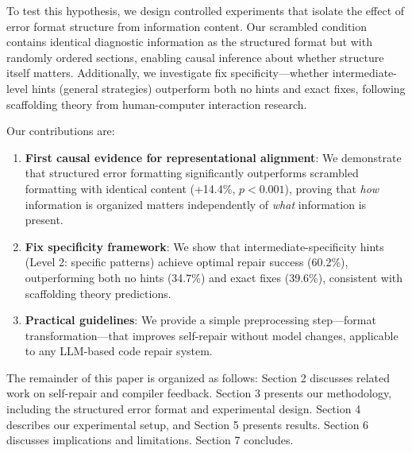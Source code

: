 To test this hypothesis, we design controlled experiments that isolate the effect of error format structure from information content. Our scrambled condition contains identical diagnostic information as the structured format but with randomly ordered sections, enabling causal inference about whether structure itself matters. Additionally, we investigate fix specificity---whether intermediate-level hints (general strategies) outperform both no hints and exact fixes, following scaffolding theory from human-computer interaction research.

Our contributions are:

\begin{enumerate}
    \item \textbf{First causal evidence for representational alignment}: We demonstrate that structured error formatting significantly outperforms scrambled formatting with identical content (+14.4\%, $p < 0.001$), proving that \emph{how} information is organized matters independently of \emph{what} information is present.

    \item \textbf{Fix specificity framework}: We show that intermediate-specificity hints (Level 2: specific patterns) achieve optimal repair success (60.2\%), outperforming both no hints (34.7\%) and exact fixes (39.6\%), consistent with scaffolding theory predictions.

    \item \textbf{Practical guidelines}: We provide a simple preprocessing step---format transformation---that improves self-repair without model changes, applicable to any LLM-based code repair system.
\end{enumerate}

The remainder of this paper is organized as follows: Section 2 discusses related work on self-repair and compiler feedback. Section 3 presents our methodology, including the structured error format and experimental design. Section 4 describes our experimental setup, and Section 5 presents results. Section 6 discusses implications and limitations. Section 7 concludes.
